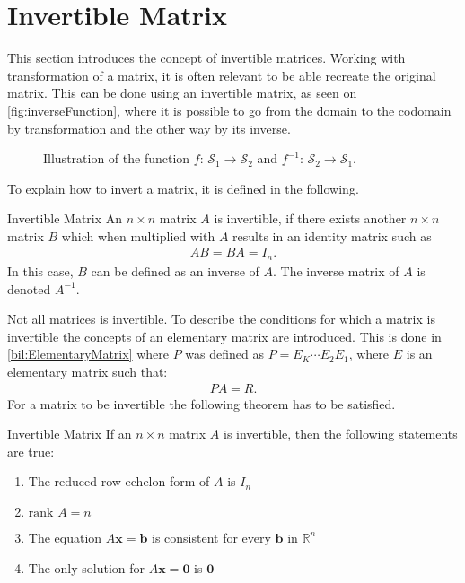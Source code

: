 \section{Invertible Matrix}
This section introduces the concept of invertible matrices. Working with transformation of a matrix, it is often relevant to be able recreate the original matrix. This can be done using an invertible matrix, as seen on \autoref{fig:inverseFunction}, where it is possible to go from the domain to the codomain by transformation and the other way by its inverse. 
\begin{figure}[H]
    \centering
    
    \caption{Illustration of the function $f$: $\mathcal{S}_1 \rightarrow \mathcal{S}_2$ and $f^{-1}$: $\mathcal{S}_2 \rightarrow \mathcal{S}_1$.}
    \label{fig:inverseFunction}
\end{figure}
To explain how to invert a matrix, it is defined in the following.
\begin{definition}{Invertible Matrix} \label{def:Invertible}
    An  $n \times n$ matrix $A$ is invertible, if there exists another $n \times n$ matrix $B$ which when multiplied with $A$ results in an identity matrix such as
    \begin{align*}
        AB=BA=I_n.
    \end{align*}
    In this case, $B$ can be defined as an inverse of $A$. The inverse matrix of $A$ is denoted $A^{-1}$. \cite[122]{LiAl}
\end{definition}
\noindent Not all matrices is invertible. To describe the conditions for which a matrix is invertible the concepts of an elementary matrix are introduced. This is done in \autoref{bil:ElementaryMatrix} where $P$ was defined as $P=E_K\cdots E_2E_1$, where $E$ is an elementary matrix such that:
\begin{align*}
    PA=R.
\end{align*}
For a matrix to be invertible the following theorem has to be satisfied.
\begin{theorem}{Invertible Matrix}
    \label{the:invertibleMatrix}
    If an $n \times n$ matrix $A$ is invertible, then the following statements are true:
    \begin{enumerate}
        \item The reduced row echelon form of $A$ is $I_n$
        \item $\text{rank } A = n$
        \item The equation $A\mathbf{x}=\mathbf{b}$ is consistent for every $\mathbf{b}$ in $\mathbb{R}^n$
        \item The only solution for $A\mathbf{x}=\mathbf{0}$ is $\mathbf{0}$
    \end{enumerate}
    \cite[138]{LiAl}
\end{theorem}
